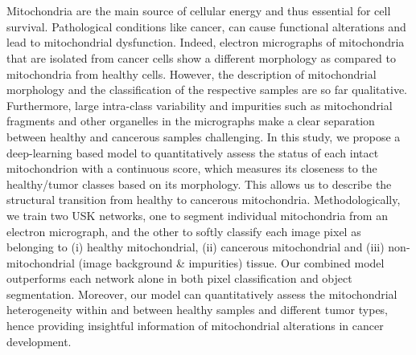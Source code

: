 \chapter{\abstractname}
	
	
Mitochondria are the main source of cellular energy and thus
essential for cell survival. Pathological conditions like cancer, can cause
functional alterations and lead to mitochondrial dysfunction. Indeed,
electron micrographs of mitochondria that are isolated from cancer cells
show a different morphology as compared to mitochondria from healthy
cells. However, the description of mitochondrial morphology and the classification of the respective samples are so far qualitative. 
Furthermore, large intra-class variability and impurities such as mitochondrial fragments and other organelles in the micrographs make a clear separation
between healthy and cancerous samples challenging. In this study, we
propose a deep-learning based model to quantitatively assess the status
of each intact mitochondrion with a continuous score, which measures
its closeness to the healthy/tumor classes based on its morphology. 
This allows us to describe the structural transition from healthy to cancerous mitochondria. 
Methodologically, we train two USK networks, one to
segment individual mitochondria from an electron micrograph, and the
other to softly classify each image pixel as belonging to (i) healthy mitochondrial, (ii) cancerous mitochondrial and (iii) non-mitochondrial (image background \& impurities) tissue. Our combined model outperforms
each network alone in both pixel classification and object segmentation.
Moreover, our model can quantitatively assess the mitochondrial heterogeneity within and between healthy samples and different tumor types,
hence providing insightful information of mitochondrial alterations in
cancer development.

